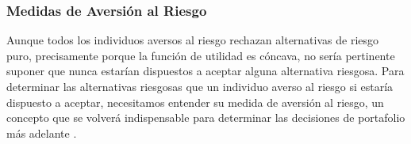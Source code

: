 \subsubsection{Medidas de Aversión al Riesgo} 

Aunque todos los individuos aversos al riesgo rechazan alternativas de riesgo puro, precisamente porque la función de utilidad es cóncava, no sería  pertinente suponer que nunca estarían dispuestos a aceptar alguna alternativa  riesgosa. Para determinar las alternativas riesgosas que un individuo averso al riesgo si estaría dispuesto a aceptar, necesitamos entender su medida de aversión al riesgo, un concepto que se volverá indispensable para determinar las decisiones de portafolio más adelante \citep{10.1093/acprof:oso/9780190241148.001.0001}.
 




